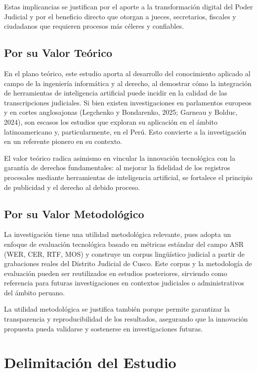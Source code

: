 \documentclass[12pt,a4paper,oneside]{report}
\begin{document}
Estas implicancias se justifican por el aporte a la transformación digital del Poder Judicial y por el beneficio directo que otorgan a jueces, secretarios, fiscales y ciudadanos que requieren procesos más céleres y confiables.

\subsection{Por su Valor Teórico}

En el plano teórico, este estudio aporta al desarrollo del conocimiento aplicado al campo de la ingeniería informática y al derecho, al demostrar cómo la integración de herramientas de inteligencia artificial puede incidir en la calidad de las transcripciones judiciales. Si bien existen investigaciones en parlamentos europeos y en cortes anglosajonas (Legchenko y Bondarenko, 2025; Garneau y Bolduc, 2024), son escasos los estudios que exploran su aplicación en el ámbito latinoamericano y, particularmente, en el Perú. Esto convierte a la investigación en un referente pionero en su contexto.

El valor teórico radica asimismo en vincular la innovación tecnológica con la garantía de derechos fundamentales: al mejorar la fidelidad de los registros procesales mediante herramientas de inteligencia artificial, se fortalece el principio de publicidad y el derecho al debido proceso.

\subsection{Por su Valor Metodológico}

La investigación tiene una utilidad metodológica relevante, pues adopta un enfoque de evaluación tecnológica basado en métricas estándar del campo ASR (WER, CER, RTF, MOS) y construye un corpus lingüístico judicial a partir de grabaciones reales del Distrito Judicial de Cusco. Este corpus y la metodología de evaluación pueden ser reutilizados en estudios posteriores, sirviendo como referencia para futuras investigaciones en contextos judiciales o administrativos del ámbito peruano.

La utilidad metodológica se justifica también porque permite garantizar la transparencia y reproducibilidad de los resultados, asegurando que la innovación propuesta pueda validarse y sostenerse en investigaciones futuras.

\section{Delimitación del Estudio}
\end{document}
